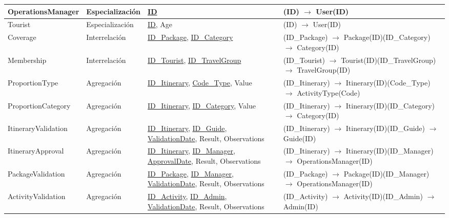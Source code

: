 \documentclass[11pt,a4paper]{article}
\begin{document}
{\begin{longtable}{|>{\raggedright\arraybackslash}p{2.88cm}|>{\raggedright\arraybackslash}p{2.35cm}|>{\raggedright\arraybackslash}p{5.00cm}|>{\raggedright\arraybackslash}p{5.07cm}|}
OperationsManager & Especialización & \underline{ID} & (ID) \ensuremath{\rightarrow} User(ID) \\ \hline
Tourist & Especialización & \underline{ID}, Age & (ID) \ensuremath{\rightarrow} User(ID) \\ \hline
Coverage & Interrelación & \underline{ID\_Package}, \underline{ID\_Category} & (ID\_Package) \ensuremath{\rightarrow} Package(ID)\newline{}(ID\_Category) \ensuremath{\rightarrow} Category(ID) \\ \hline
Membership & Interrelación & \underline{ID\_Tourist}, \underline{ID\_TravelGroup} & (ID\_Tourist) \ensuremath{\rightarrow} Tourist(ID)\newline{}(ID\_TravelGroup) \ensuremath{\rightarrow} TravelGroup(ID) \\ \hline
ProportionType & Agregación & \underline{ID\_Itinerary}, \underline{Code\_Type}, Value & (ID\_Itinerary) \ensuremath{\rightarrow} Itinerary(ID)\newline{}(Code\_Type) \ensuremath{\rightarrow} ActivityType(Code) \\ \hline
ProportionCategory & Agregación & \underline{ID\_Itinerary}, \underline{ID\_Category}, Value & (ID\_Itinerary) \ensuremath{\rightarrow} Itinerary(ID)\newline{}(ID\_Category) \ensuremath{\rightarrow} Category(ID) \\ \hline
ItineraryValidation & Agregación & \underline{ID\_Itinerary}, \underline{ID\_Guide}, \underline{ValidationDate}, Result, Observations & (ID\_Itinerary) \ensuremath{\rightarrow} Itinerary(ID)\newline{}(ID\_Guide) \ensuremath{\rightarrow} Guide(ID) \\ \hline
ItineraryApproval & Agregación & \underline{ID\_Itinerary}, \underline{ID\_Manager}, \underline{ApprovalDate}, Result, Observations & (ID\_Itinerary) \ensuremath{\rightarrow} Itinerary(ID)\newline{}(ID\_Manager) \ensuremath{\rightarrow} OperationsManager(ID) \\ \hline
PackageValidation & Agregación & \underline{ID\_Package}, \underline{ID\_Manager}, \underline{ValidationDate}, Result, Observations & (ID\_Package) \ensuremath{\rightarrow} Package(ID)\newline{}(ID\_Manager) \ensuremath{\rightarrow} OperationsManager(ID) \\ \hline
ActivityValidation & Agregación & \underline{ID\_Activity}, \underline{ID\_Admin}, \underline{ValidationDate}, Result, Observations & (ID\_Activity) \ensuremath{\rightarrow} Activity(ID)\newline{}(ID\_Admin) \ensuremath{\rightarrow} Admin(ID) \\ \hline

\end{longtable}}
\end{document}
